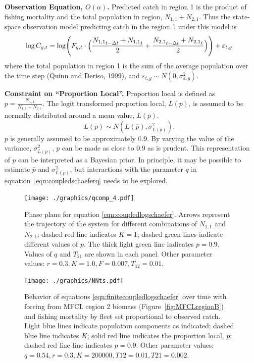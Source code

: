 \documentclass[12pt,letterpaper]{article}
\newcommand\None{{N_{1,1}}}
\newcommand\Ntwo{{N_{2,1}}}
\newcommand\Nsum{{N_{1,1}+N_{2,1}}}
\begin{document}
{\bf Observation Equation, $O(\alpha)$.}
Predicted catch in region 1 is the product of fishing mortality
and the total population in region, $\None+\Ntwo$.
Thus the state-space observation model predicting catch in the region 1
under this model is
\begin{equation}
\log C_{g,t} = \log \Biggl(F_{g,t}\cdot\Bigl(\frac{\None_{t-\Delta t}+\None_t}{2}
                           +\frac{\Ntwo_{t-\Delta
t}+\Ntwo_t}{2}\Bigr)\Biggr) + \varepsilon_{t,g}
\label{eqn:obs}
\end{equation}
where the total population in region 1 is the sum of the average
population over the time step (Quinn and Deriso, 1999), and
$\varepsilon_{t,g} \sim N(0,\sigma^2_{\varepsilon,g})$.

{\bf Constraint on ``Proportion Local''.}
Proportion local is defined as $p = \frac{\None}{\Nsum}$. The logit
transformed proportion local, $L(p)$, is assumed to be normally
distributed around a mean value, $L(\bar{p})$.
\begin{equation}
\label{eqn:LpropL}
L(p)\sim N(L(\bar{p}),\sigma^2_{L(p)}).
\end{equation} 
$p$ is generally assumed to be approximately $0.9$. By varying the
value of the variance, $\sigma^2_{L(p)}$, $p$ can be made as
close to $0.9$ as is prudent.
This representation of $p$ can be interpreted as a Bayesian prior.
In principle, it may be possible to
estimate $\bar{p}$ and $\sigma^2_{L(p)}$, but interactions with
the parameter $q$ in equation~\ref{eqn:coupledschaeferq} needs to be
explored.

\begin{figure}
\begin{center}
\texttt{[image: ./graphics/qcomp\_4.pdf]}
\caption{\label{fig:NNphase}
Phase plane for equation \ref{eqn:coupledlogschaefer}. Arrows represent
the trajectory of the system for different combinations of $\None$ and
$\Ntwo$; dashed red  line indicates $K = 1$; dashed green lines indicate
different values of $p$. The thick light green line indicates $p=0.9$.
Values of $q$ and $T_{21}$ are shown in each panel.
Other parameter values: $r=0.3, K=1.0, F = 0.007, T_{12}=0.01$.
}
\end{center}
\end{figure}

\begin{figure}
\begin{center}
\texttt{[image: ./graphics/NNts.pdf]}
\caption{\label{fig:NNts}
Behavior of equations \ref{eqn:finitecoupledlogschaefer} over time with
forcing from MFCL region 2 biomass (Figure~\ref{fig:MFCLregionB}) and
fishing mortality by fleet set proportional to observed catch.
Light blue lines indicate population components as indicated; 
dashed blue line indicates $K$;
solid red line indicates the proportion local, $p$;  
dashed red line line indicates $p=0.9$.
Other parameter values: $q=0.54, r=0.3, K=200000, T12=0.01, T21=0.002$.
}
\end{center}
\end{figure}
\end{document}
